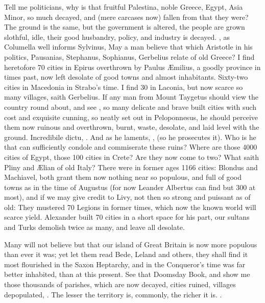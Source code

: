 {Tell me politicians, why is that fruitful Palestina, noble Greece,
Egypt, Asia Minor, so much decayed, and (mere carcases now) fallen from
that they were? The ground is the same, but the government is altered,
the people are grown slothful, idle, their good husbandry, policy, and
industry is decayed. , as Columella
well informs Sylvinus,  May a man believe
that which Aristotle in his politics, Pausanias, Stephanus, Sophianus,
Gerbelius relate of old Greece? I find heretofore 70 cities in Epirus
overthrown by Paulus \AE{}milius, a goodly province in times past,
now left desolate of good towns and almost inhabitants. Sixty-two
cities in Macedonia in Strabo's time. I find 30 in Laconia, but now
scarce so many villages, saith Gerbelius. If any man from Mount
Taygetus should view the country round about, and see , so many delicate and brave built
cities with such cost and exquisite cunning, so neatly set out in
Peloponnesus, he should perceive them now ruinous and overthrown,
burnt, waste, desolate, and laid level with the ground. Incredibile
dictu, \etc{}. And as he laments, , (so he prosecutes it). Who is he that
can sufficiently condole and commiserate these ruins? Where are those
4000 cities of Egypt, those 100 cities in Crete? Are they now come to
two? What saith Pliny and \AE{}lian of old Italy? There were in former
ages 1166 cities: Blondus and Machiavel, both grant them now nothing
near so populous, and full of good towns as in the time of Augustus
(for now Leander Albertus can find but 300 at most), and if we may give
credit to Livy, not then so strong and puissant as of old: They
mustered 70 Legions in former times, which now the known world will
scarce yield. Alexander built 70 cities in a short space for his part,
our sultans and Turks demolish twice as many, and leave all desolate.

Many will not believe but that our island of Great Britain is now more
populous than ever it was; yet let them read Bede, Leland and others,
they shall find it most flourished in the Saxon Heptarchy, and in the
Conqueror's time was far better inhabited, than at this present. See
that Doomsday Book, and show me those thousands of parishes, which are
now decayed, cities ruined, villages depopulated, \etc{}. The lesser the
territory is, commonly, the richer it is. .

}
